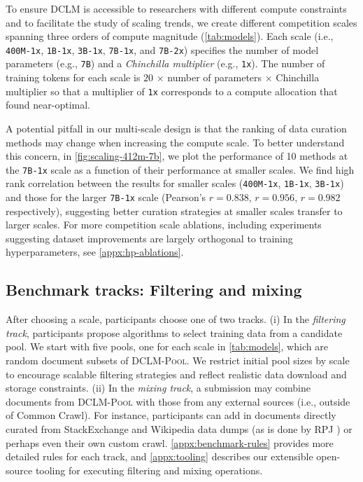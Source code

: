 To ensure \textsc{DCLM} is accessible to researchers with different compute constraints and to facilitate the study of scaling trends, we create different competition scales spanning three orders of compute magnitude (\ref{tab:models}).
Each scale (i.e., \texttt{400M-1x}, \texttt{1B-1x}, \texttt{3B-1x}, \texttt{7B-1x}, and \texttt{7B-2x}) specifies the number of model parameters (e.g., \texttt{7B}) and a \emph{Chinchilla multiplier} (e.g., \texttt{1x}).
The number of training tokens for each scale is $20$ $\times$ number of parameters $\times$ Chinchilla multiplier so that a multiplier of \texttt{1x} corresponds to a compute allocation that \citet{chinchilla} found near-optimal.

A potential pitfall in our multi-scale design is that the ranking of data curation methods may change when increasing the compute scale. To better understand this concern, in \ref{fig:scaling-412m-7b}, we plot the performance of 10 methods at the \texttt{7B-1x} scale as a function of their performance at smaller scales. We find high rank correlation between the results for smaller scales (\texttt{400M-1x}, \texttt{1B-1x}, \texttt{3B-1x}) and those for the larger \texttt{7B-1x} scale (Pearson's $r=0.838$, $r=0.956$, $r=0.982$ respectively), suggesting better curation strategies at smaller scales transfer to larger scales. For more competition scale ablations, including experiments suggesting dataset improvements are largely orthogonal to training hyperparameters, see \ref{appx:hp-ablations}.

\subsection{Benchmark tracks: Filtering and mixing}
\label{sec:tracks}
After choosing a scale, participants choose one of two tracks. (i) In the \emph{filtering track}, participants propose algorithms to select training data from a candidate pool. We start with five pools, one for each scale in \ref{tab:models}, which are random document subsets of \textsc{DCLM-Pool}.
We restrict initial pool sizes by scale to encourage scalable filtering strategies and reflect realistic data download and storage constraints. (ii) In the \emph{mixing track}, a submission may combine documents from \textsc{DCLM-Pool} with those from any external sources (i.e., outside of Common Crawl). For instance, participants can add in documents directly curated from StackExchange and Wikipedia data dumps (as is done by RPJ \citep{rpj}) or perhaps even their own custom crawl.
\ref{appx:benchmark-rules} provides more detailed rules for each track, and \ref{appx:tooling} describes our extensible open-source tooling for executing filtering and mixing operations.

